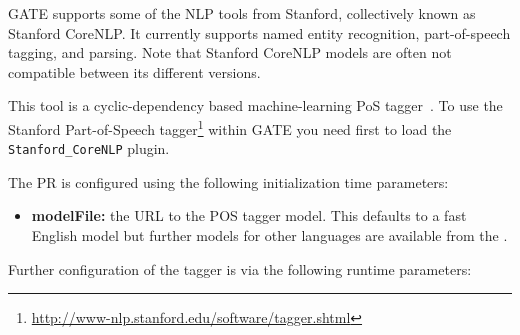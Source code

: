 GATE supports some of the NLP tools from Stanford, collectively known as 
Stanford CoreNLP. It currently supports named entity recognition, 
part-of-speech tagging, and parsing. Note that Stanford CoreNLP models are
often not compatible between its different versions.


This tool is a cyclic-dependency based machine-learning PoS tagger~\cite{Toutanova2003a}.
To use the Stanford Part-of-Speech tagger\footnote{\url{http://www-nlp.stanford.edu/software/tagger.shtml}}
within GATE you need first to load the \verb|Stanford_CoreNLP| plugin.

The PR is configured using the following initialization time parameters:

\begin{itemize}
\item \textbf{modelFile:} the URL to the POS tagger model. This defaults to a
  fast English model but further models for other languages are available from the
  .
\end{itemize}

Further configuration of the tagger is via the following runtime parameters:


